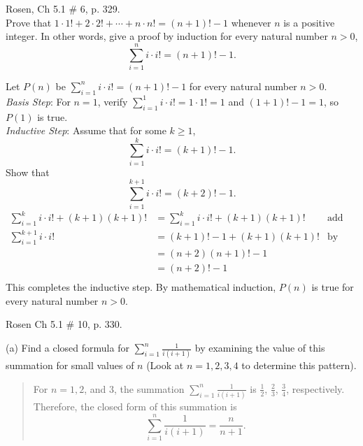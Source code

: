 \documentclass[11pt]{exam}
\begin{document}
\begin{questions}
\question Rosen, Ch 5.1 \# 6, p. 329. \\ Prove that $1\cdot 1! +
2\cdot 2! + \cdots + n\cdot n! = (n+1)! - 1$ whenever $n$ is a
positive integer. In other words, give a proof by induction for
every natural number $n > 0$,
\[ \sum_{i=1}^n i\cdot i! = (n+1)! - 1.\]

\begin{solution}
    Let $P(n)$ be $\displaystyle \sum_{i=1}^n i\cdot i! = (n+1)! - 1$
    for every natural number $n >0$. \\
    \textit{Basis Step}: For $n=1$, verify
    $\sum_{i=1}^1 i \cdot i! = 1 \cdot 1! = 1$ and
    $(1+1)!-1 = 1$, so $P(1)$ is true. \\
    \smallskip
    \textit{Inductive Step}: Assume that for some $k \geq 1$,
    \[ \sum_{i=1}^k i\cdot i! = (k+1)! - 1. \]
    Show that
    \[ \sum_{i=1}^{k+1} i\cdot i! = (k+2)! - 1. \]
    \begin{align*}
        \sum_{i=1}^{k} i\cdot i! + (k+1)(k+1)! &= \sum_{i=1}^k i\cdot i! + (k+1)(k+1)!  & \text{add term to both sides} \\
        \sum_{i=1}^{k+1} i\cdot i!  &= (k+1)!-1 + (k+1)(k+1)! & \text{by def. of sum and ind. hyp.} \\
          &= (n+2)(n+1)! - 1  \\
          &= (n+2)! - 1 \\
    \end{align*}
    This completes the inductive step.  By mathematical induction, $P(n)$ is true for every natural number $n>0$.
\end{solution}


\question Rosen Ch 5.1 \# 10, p. 330.
\begin{solution}
(a) Find a closed formula for $\displaystyle \sum_{i=1}^n \frac{1}{i(i+1)}$ by examining the value of this summation for small values of $n$ (Look at $n=1,2,3,4$ to determine this pattern).\\
\begin{quote}
    For $n=1,2$, and $3$, the summation $\displaystyle \sum_{i=1}^n \frac{1}{i(i+1)}$ is $\frac{1}{2}$, $\frac{2}{3}$, $\frac{3}{4}$, respectively.  Therefore, the closed form of this summation is
    \[ \sum_{i=1}^n \frac{1}{i(i+1)} = \frac{n}{n+1}. \]
\end{quote}


\end{solution}
\end{questions}
\end{document}
